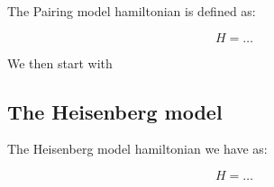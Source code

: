 The Pairing model hamiltonian is defined as:

\begin{equation}
  H = \dots
  \label{eq:Pairing_model_imp}
\end{equation}

We then start with

\subsection{The Heisenberg model}

The Heisenberg model hamiltonian we have as:

\begin{equation}
  H = \dots
  \label{eq:Heisenberg_model_imp}
\end{equation}


